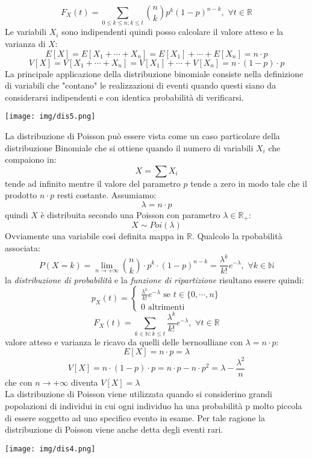 \documentclass[a4paper,12pt, oneside]{book}
\newcommand{\numberset}{\mathbb}
\newcommand{\R}{\numberset{R}}
\begin{document}
\[F_X(t)=\sum_{0\leq k\leq n;k\leq t}\binom{n}{k}p^k(1-p)^{n-k},\,\,\forall t\in \R\]
Le variabili $X_i$ sono indipendenti quindi posso calcolare il valore atteso e la varianza di $X$:
\[E[X]=E[X_1+\cdots+X_n]=E[X_1]+\cdots+E[X_n]=n\cdot p\]
\[V[X]=V[X_1+\cdots+X_n]=V[X_1]+\cdots+V[X_n]=n\cdot (1-p)\cdot p\]
La principale applicazione della distribuzione binomiale consiste nella definizione di variabili che "contano" le realizzazioni di eventi quando questi siano da considerarsi indipendenti e con identica probabilità di verificarsi.\\
\begin{center}
	\texttt{[image: img/dis5.png]}
\end{center}
La distribuzione di Poisson può essere vista come un caso particolare della
distribuzione Binomiale che si ottiene quando il numero di variabili $X_i$ che compaiono in:
\[X=\sum X_i\]
tende ad infinito mentre il valore del parametro $p$ tende a zero in modo tale che il prodotto $n\cdot p$ resti costante. Assumiamo:
\[\lambda = n\cdot p\]
quindi $X$ è distribuita secondo una Poisson con parametro $\lambda\in\R_+$:
\[X\sim Poi(\lambda)\]
Ovviamente una variabile così definita mappa in $\R$. Qualcolo la rpobabilità associata:
\[P(X=k)=\lim_{n\to+\infty} \binom{n}{k}\cdot p^k\cdot (1-p)^{n-k}=\frac{\lambda^k}{k!}e^{-\lambda},\,\,\forall k\in\mathbb{N}\]
la \textit{distribuzione di probabilità} e la \textit{funzione di ripartizione} risultano essere quindi:
\[p_X(t)=\begin{cases}
\frac{\lambda^k}{k!}e^{-\lambda} \mbox{ se } t\in\{0,\cdots, n\}\\
0 \mbox{ altrimenti}
\end{cases}\]
\[F_X(t)=\sum_{k\in\mathbb{N}:k\leq t}\frac{\lambda^k}{k!}e^{-\lambda},\,\,\forall t\in\R \]
valore atteso e varianza le ricavo da quelli delle bernoulliane con $\lambda=n\cdot p$:
\[E[X]=n\cdot p=\lambda\]
\[V[X]=n\cdot (1-p)\cdot p=n\cdot p-n\cdot p^2= \lambda-\frac{\lambda^2}{n}\]
che con $n\to +\infty$ diventa $V [X]=\lambda$\\
La distribuzione di Poisson viene utilizzata quando si considerino grandi popolazioni di individui in cui ogni individuo ha una probabilità p molto piccola di essere soggetto ad uno specifico evento in esame. Per tale ragione la distribuzione di Poisson viene anche detta degli eventi rari.\\
\begin{center}
	\texttt{[image: img/dis4.png]}
\end{center}
\end{document}

